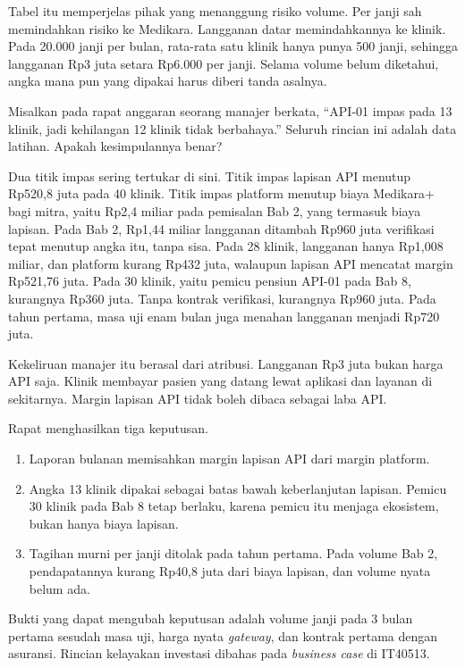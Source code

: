 Tabel itu memperjelas pihak yang menanggung risiko volume. Per janji sah memindahkan risiko ke Medikara. Langganan datar memindahkannya
ke klinik. Pada 20.000 janji per bulan, rata-rata satu klinik hanya punya 500 janji, sehingga langganan Rp3 juta setara Rp6.000 per
janji. Selama volume belum diketahui, angka mana pun yang dipakai harus diberi tanda asalnya.

\begin{kasus}[title={Kasus Medikara Health: Titik Impas API-01 Bukan Titik Impas Platform}]
Misalkan pada rapat anggaran seorang manajer berkata, ``API-01 impas pada 13 klinik, jadi kehilangan 12 klinik tidak berbahaya.''
Seluruh rincian ini adalah data latihan. Apakah kesimpulannya benar?

Dua titik impas sering tertukar di sini. Titik impas lapisan API menutup Rp520,8 juta pada 40 klinik. Titik impas platform menutup biaya
Medikara+ bagi mitra, yaitu Rp2,4 miliar pada pemisalan Bab 2, yang termasuk biaya lapisan. Pada Bab 2, Rp1,44 miliar langganan ditambah
Rp960 juta verifikasi tepat menutup angka itu, tanpa sisa. Pada 28 klinik, langganan hanya Rp1,008 miliar, dan platform kurang Rp432
juta, walaupun lapisan API mencatat margin Rp521,76 juta. Pada 30 klinik, yaitu pemicu pensiun API-01 pada Bab 8, kurangnya Rp360
juta. Tanpa kontrak verifikasi, kurangnya Rp960 juta. Pada tahun pertama, masa uji enam bulan juga menahan langganan menjadi Rp720 juta.

Kekeliruan manajer itu berasal dari atribusi. Langganan Rp3 juta bukan harga API saja. Klinik membayar pasien yang datang lewat
aplikasi dan layanan di sekitarnya. Margin lapisan API tidak boleh dibaca sebagai laba API.

Rapat menghasilkan tiga keputusan.
\begin{enumerate}
  \item Laporan bulanan memisahkan margin lapisan API dari margin platform.
  \item Angka 13 klinik dipakai sebagai batas bawah keberlanjutan lapisan. Pemicu 30 klinik pada Bab 8 tetap berlaku, karena pemicu itu
        menjaga ekosistem, bukan hanya biaya lapisan.
  \item Tagihan murni per janji ditolak pada tahun pertama. Pada volume Bab 2, pendapatannya kurang Rp40,8 juta dari biaya lapisan,
        dan volume nyata belum ada.
\end{enumerate}

Bukti yang dapat mengubah keputusan adalah volume janji pada 3 bulan pertama sesudah masa uji, harga nyata \textit{gateway}, dan kontrak
pertama dengan asuransi. Rincian kelayakan investasi dibahas pada \textit{business case} di IT40513.
\end{kasus}

